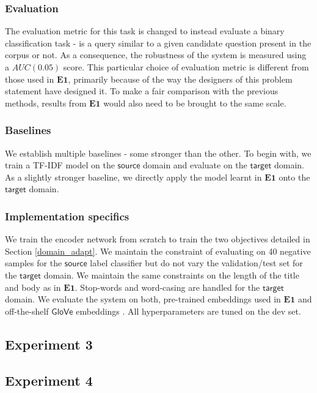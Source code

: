 \documentclass{sigkddExp}
\begin{document}
\subsubsection{Evaluation} The evaluation metric for this task is changed to instead evaluate a binary classification task - is a query similar to a given candidate question present in the corpus or not. As a consequence, the robustness of the system is measured using a $AUC(0.05)$ score. This particular choice of evaluation metric is different from those used in $\mathbf{E1}$, primarily because of the way the designers of this problem statement have designed it. To make a fair comparison with the previous methods, results from $\mathbf{E1}$ would also need to be brought to the same scale.

\subsubsection{Baselines} We establish multiple baselines - some stronger than the other. To begin with, we train a TF-IDF model on the $\textsf{source}$ domain and evaluate on the $\textsf{target}$ domain. As a slightly stronger baseline, we directly apply the model learnt in $\mathbf{E1}$ onto the $\textsf{target}$ domain.

\subsubsection{Implementation specifics} We train the encoder network from scratch to train the two objectives detailed in Section \ref{domain_adapt}. We maintain the constraint of evaluating on 40 negative samples for the $\mathsf{source}$ label classifier but do not vary the validation/test set for the $\mathsf{target}$ domain. We maintain the same constraints on the length of the title and body as in $\mathbf{E1}$. Stop-words and word-casing are handled for the $\mathsf{target}$ domain. We evaluate the system on both, pre-trained embeddings used in $\mathbf{E1}$ and off-the-shelf $\mathsf{GloVe}$ embeddings \cite{pennington2014glove}. All hyperparameters are tuned on the dev set.

\subsection{Experiment 3}

\subsection{Experiment 4}
\end{document}
